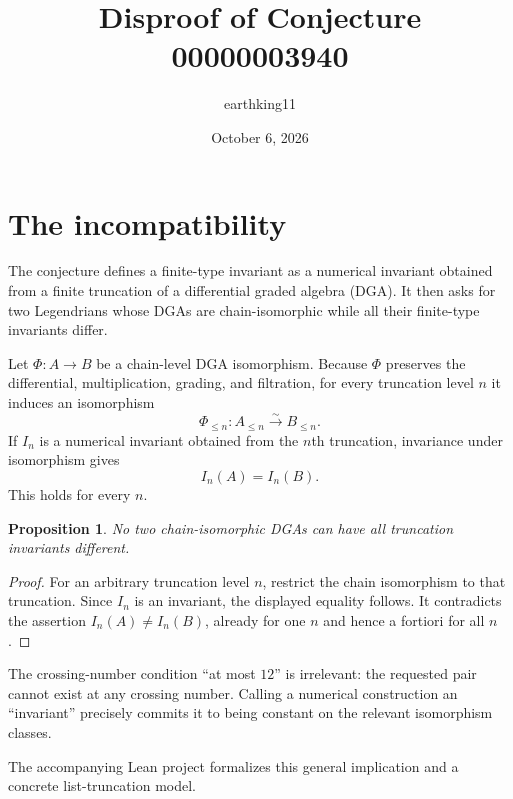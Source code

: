 \documentclass[11pt]{article}
\title{Disproof of Conjecture 00000003940}
\author{earthking11}
\date{October 6, 2026}
\newtheorem{proposition}{Proposition}
\begin{document}
\maketitle
\section*{The incompatibility}
The conjecture defines a finite-type invariant as a numerical invariant
obtained from a finite truncation of a differential graded algebra (DGA).  It
then asks for two Legendrians whose DGAs are chain-isomorphic while all their
finite-type invariants differ.

Let $\Phi:A\to B$ be a chain-level DGA isomorphism.  Because $\Phi$ preserves
the differential, multiplication, grading, and filtration, for every truncation
level $n$ it induces an isomorphism
\[
 \Phi_{\le n}:A_{\le n}\xrightarrow{\sim}B_{\le n}.
\]
If $I_n$ is a numerical invariant obtained from the $n$th truncation, invariance
under isomorphism gives
\[
 I_n(A)=I_n(B).
\]
This holds for every $n$.

\begin{proposition}
No two chain-isomorphic DGAs can have all truncation invariants different.
\end{proposition}
\begin{proof}
For an arbitrary truncation level $n$, restrict the chain isomorphism to that
truncation.  Since $I_n$ is an invariant, the displayed equality follows.  It
contradicts the assertion $I_n(A)\ne I_n(B)$, already for one $n$ and hence a
fortiori for all $n$.
\end{proof}

The crossing-number condition ``at most $12$'' is irrelevant: the requested
pair cannot exist at any crossing number.  Calling a numerical construction an
``invariant'' precisely commits it to being constant on the relevant
isomorphism classes.

The accompanying Lean project formalizes this general implication and a
concrete list-truncation model.
\end{document}
